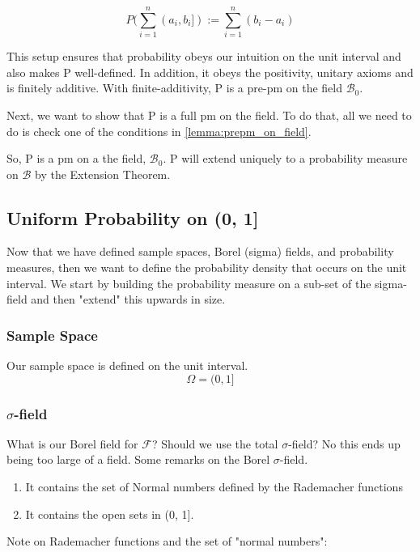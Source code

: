 \documentclass{article}
\theoremstyle{proposition}
\begin{document}
				$$P(\sum_{i=1}^n (a_i, b_i]) := \sum_{i=1}^n (b_i - a_i)$$

			This setup ensures that probability obeys our intuition on the unit interval and also makes P well-defined. In addition, it obeys the positivity, unitary axioms and is finitely additive. With finite-additivity, P is a pre-pm on the field $\mathcal{B}_0$.

			Next, we want to show that P is a full pm on the field. To do that, all we need to do is check one of the conditions in \ref{lemma:prepm_on_field}.

			So, P is a pm on a the field, $\mathcal{B}_0$. P will extend uniquely to a probability measure on $\mathcal{B}$ by the Extension Theorem.

	\subsection{Uniform Probability on (0, 1]}
		Now that we have defined sample spaces, Borel (sigma) fields, and probability measures, then we want to define the probability density that occurs on the unit interval. We start by building the probability measure on a sub-set of the sigma-field and then "extend" this upwards in size.

		\subsubsection{Sample Space}
			Our sample space is defined on the unit interval.
				$$\Omega = (0, 1]$$

		\subsubsection{$\sigma$-field}
			What is our Borel field for $\mathcal{F}$? Should we use the total $\sigma$-field? No this ends up being too large of a field. Some remarks on the Borel $\sigma$-field.

			\begin{enumerate}
				\item It contains the set of Normal numbers defined by the Rademacher functions
				\item It contains the open sets in (0, 1]. 

			\end{enumerate}

			Note on Rademacher functions and the set of "normal numbers":
\end{document}
